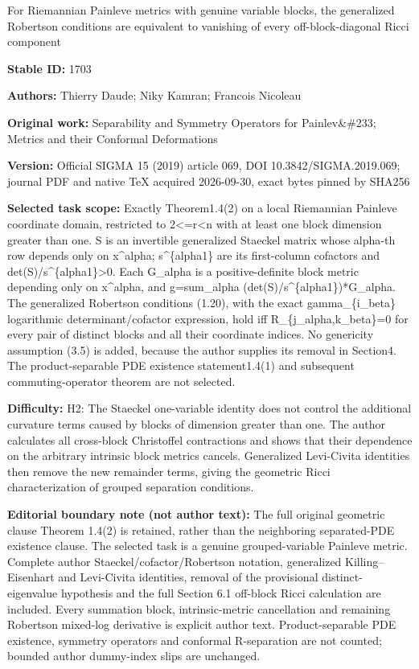\documentclass[11pt]{article}
\numberwithin{equation}{section}
\begin{document}
\begin{center}\Large For Riemannian Painleve metrics with genuine variable blocks, the generalized Robertson conditions are equivalent to vanishing of every off-block-diagonal Ricci component\end{center}
\noindent\textbf{Stable ID:} 1703\par
\noindent\textbf{Authors:} Thierry Daude; Niky Kamran; Francois Nicoleau\par
\noindent\textbf{Original work:} Separability and Symmetry Operators for Painlev\&\#233; Metrics and their Conformal Deformations\par
\noindent\textbf{Version:} Official SIGMA 15 (2019) article 069, DOI 10.3842/SIGMA.2019.069; journal PDF and native TeX acquired 2026-09-30, exact bytes pinned by SHA256\par
\noindent\textbf{Selected task scope:} Exactly Theorem1.4(2) on a local Riemannian Painleve coordinate domain, restricted to 2<=r<n with at least one block dimension greater than one. S is an invertible generalized Staeckel matrix whose alpha-th row depends only on x\textasciicircum{}alpha; s\textasciicircum{}\{alpha1\} are its first-column cofactors and det(S)/s\textasciicircum{}\{alpha1\}>0. Each G\_alpha is a positive-definite block metric depending only on x\textasciicircum{}alpha, and g=sum\_alpha (det(S)/s\textasciicircum{}\{alpha1\})*G\_alpha. The generalized Robertson conditions (1.20), with the exact gamma\_\{i\_beta\} logarithmic determinant/cofactor expression, hold iff R\_\{j\_alpha,k\_beta\}=0 for every pair of distinct blocks and all their coordinate indices. No genericity assumption (3.5) is added, because the author supplies its removal in Section4. The product-separable PDE existence statement1.4(1) and subsequent commuting-operator theorem are not selected.\par
\noindent\textbf{Difficulty:} H2: The Staeckel one-variable identity does not control the additional curvature terms caused by blocks of dimension greater than one. The author calculates all cross-block Christoffel contractions and shows that their dependence on the arbitrary intrinsic block metrics cancels. Generalized Levi-Civita identities then remove the new remainder terms, giving the geometric Ricci characterization of grouped separation conditions.\par
\noindent\textbf{Editorial boundary note (not author text):} The full original geometric clause Theorem 1.4(2) is retained, rather than the neighboring separated-PDE existence clause. The selected task is a genuine grouped-variable Painleve metric. Complete author Staeckel/cofactor/Robertson notation, generalized Killing–Eisenhart and Levi-Civita identities, removal of the provisional distinct-eigenvalue hypothesis and the full Section 6.1 off-block Ricci calculation are included. Every summation block, intrinsic-metric cancellation and remaining Robertson mixed-log derivative is explicit author text. Product-separable PDE existence, symmetry operators and conformal R-separation are not counted; bounded author dummy-index slips are unchanged.\par
\end{document}
